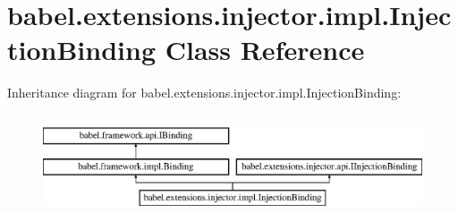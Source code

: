\hypertarget{classbabel_1_1extensions_1_1injector_1_1impl_1_1_injection_binding}{\section{babel.\-extensions.\-injector.\-impl.\-Injection\-Binding Class Reference}
\label{classbabel_1_1extensions_1_1injector_1_1impl_1_1_injection_binding}
}
Inheritance diagram for babel.\-extensions.\-injector.\-impl.\-Injection\-Binding\-:\begin{figure}[H]
\begin{center}
\leavevmode
\includegraphics[height=3.000000cm]{classbabel_1_1extensions_1_1injector_1_1impl_1_1_injection_binding}
\end{center}
\end{figure}
